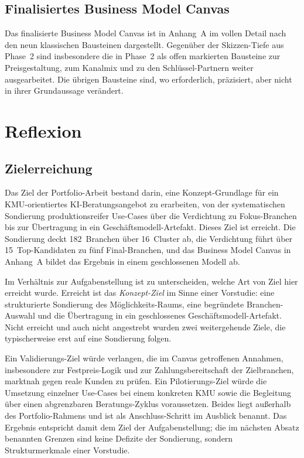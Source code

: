 \documentclass[a4paper,11pt]{article}
\begin{document}
\subsection{Finalisiertes Business Model Canvas}

Das finalisierte Business Model Canvas ist in Anhang~A im vollen Detail
nach den neun klassischen Bausteinen dargestellt. Gegenüber der
Skizzen-Tiefe aus Phase~2 sind insbesondere die in Phase~2 als offen
markierten Bausteine zur Preisgestaltung, zum Kanalmix und zu den
Schlüssel-Partnern weiter ausgearbeitet. Die übrigen Bausteine sind, wo
erforderlich, präzisiert, aber nicht in ihrer Grundaussage verändert.

\section{Reflexion}

\subsection{Zielerreichung}

Das Ziel der Portfolio-Arbeit bestand darin, eine
Konzept-Grundlage für ein KMU-orientiertes KI-Beratungsangebot zu
erarbeiten, von der systematischen Sondierung produktionsreifer
Use-Cases über die Verdichtung zu Fokus-Branchen bis zur Übertragung in
ein Geschäftsmodell-Artefakt. Dieses Ziel ist erreicht. Die Sondierung
deckt 182~Branchen über 16~Cluster ab, die Verdichtung führt über
15~Top-Kandidaten zu fünf Final-Branchen, und das Business Model Canvas
in Anhang~A bildet das Ergebnis in einem geschlossenen Modell ab.

Im Verhältnis zur Aufgabenstellung ist zu unterscheiden, welche Art von
Ziel hier erreicht wurde. Erreicht ist das \emph{Konzept-Ziel} im Sinne
einer Vorstudie: eine strukturierte Sondierung des Möglichkeits-Raums,
eine begründete Branchen-Auswahl und die Übertragung in ein
geschlossenes Geschäftsmodell-Artefakt. Nicht erreicht und auch nicht
angestrebt wurden zwei weitergehende Ziele, die typischerweise erst auf
eine Sondierung folgen.

Ein Validierungs-Ziel würde verlangen, die im Canvas getroffenen
Annahmen, insbesondere zur Festpreis-Logik und zur Zahlungsbereitschaft
der Zielbranchen, marktnah gegen reale Kunden zu prüfen. Ein
Pilotierungs-Ziel würde die Umsetzung einzelner Use-Cases bei einem
konkreten KMU sowie die Begleitung über einen abgrenzbaren
Beratungs-Zyklus voraussetzen. Beides liegt außerhalb des
Portfolio-Rahmens und ist als Anschluss-Schritt im Ausblick benannt.
Das Ergebnis entspricht damit dem Ziel der Aufgabenstellung; die im
nächsten Absatz benannten Grenzen sind keine Defizite der Sondierung,
sondern Strukturmerkmale einer Vorstudie.
\end{document}
